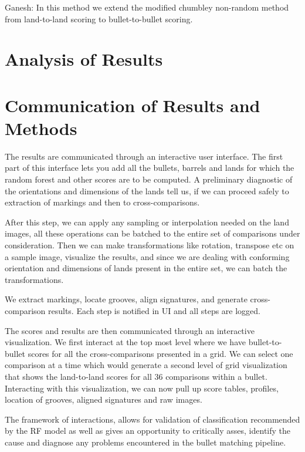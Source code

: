 \documentclass[]{book}
\begin{document}
Ganesh: In this method we extend the modified chumbley non-random method from land-to-land scoring to bullet-to-bullet scoring.

\hypertarget{analysis-of-results}{%
\section{Analysis of Results}\label{analysis-of-results}}

\hypertarget{communication-of-results-and-methods}{%
\section{Communication of Results and Methods}\label{communication-of-results-and-methods}}

The results are communicated through an interactive user interface. The first part of this interface lets you add all the bullets, barrels and lands for which the random forest and other scores are to be computed. A preliminary diagnostic of the orientations and dimensions of the lands tell us, if we can proceed safely to extraction of markings and then to cross-comparisons.

After this step, we can apply any sampling or interpolation needed on the land images, all these operations can be batched to the entire set of comparisons under consideration. Then we can make transformations like rotation, transpose etc on a sample image, visualize the results, and since we are dealing with conforming orientation and dimensions of lands present in the entire set, we can batch the transformations.

We extract markings, locate grooves, align signatures, and generate cross-comparison results. Each step is notified in UI and all steps are logged.

The scores and results are then communicated through an interactive visualization. We first interact at the top most level where we have bullet-to-bullet scores for all the cross-comparisons presented in a grid. We can select one comparison at a time which would generate a second level of grid visualization that shows the land-to-land scores for all 36 comparisons within a bullet. Interacting with this visualization, we can now pull up score tables, profiles, location of grooves, aligned signatures and raw images.

The framework of interactions, allows for validation of classification recommended by the RF model as well as gives an opportunity to critically asses, identify the cause and diagnose any problems encountered in the bullet matching pipeline.
\end{document}

